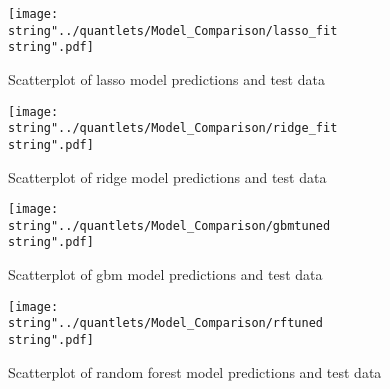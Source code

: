 \begin{figure}[H]
\centering
	\texttt{[image: \\string"../quantlets/Model\_Comparison/lasso\_fit\\string".pdf]}
  	\caption{Scatterplot of lasso model predictions and test data}
  	\label{fig:lasso}
\end{figure}

\begin{figure}[H]
\centering
	\texttt{[image: \\string"../quantlets/Model\_Comparison/ridge\_fit\\string".pdf]}
  	\caption{Scatterplot of ridge model predictions and test data}
  	\label{fig:ridge}
\end{figure}

\begin{figure}[H]
\centering
	\texttt{[image: \\string"../quantlets/Model\_Comparison/gbmtuned\\string".pdf]}
  	\caption{Scatterplot of gbm model predictions and test data}
  	\label{fig:gbm}
\end{figure}

\begin{figure}[H]
\centering
	\texttt{[image: \\string"../quantlets/Model\_Comparison/rftuned\\string".pdf]}
  	\caption{Scatterplot of random forest model predictions and test data}
  	\label{fig:rf}
\end{figure}



